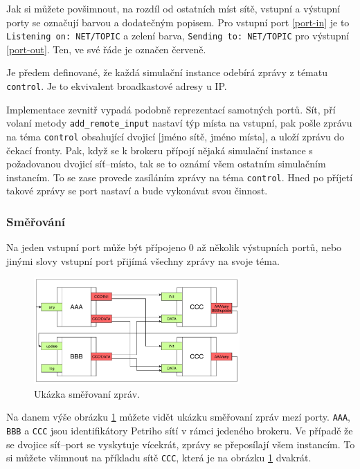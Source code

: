 Jak si můžete povšimnout, na rozdíl od ostatních míst sítě, vstupní a výstupní porty se označují barvou a dodatečným popisem. Pro vstupní port \ref{port-in} je to \texttt{Listening on: NET/TOPIC} a zelení barva, \texttt{Sending to: NET/TOPIC} pro výstupní \ref{port-out}. Ten, ve své řáde je označen červeně.

Je předem definované, že každá simulační instance odebírá zprávy z tématu \texttt{control}. Je to ekvivalent broadkastové adresy u IP.

Implementace zevnitř vypadá podobně reprezentací samotných portů. Sít, pří volaní metody \texttt{add\_remote\_input} nastaví týp místa na vstupní, pak pošle zprávu na téma \texttt{control} obsahující dvojicí [jméno sítě, jméno místa], a uloží zprávu do čekací fronty. Pak, když se k brokeru přípojí nějaká simulační instance s požadovanou dvojicí síť--místo, tak se to oznámí všem ostatním simulačním instancím. To se zase provede zasíláním zprávy na téma \texttt{control}. Hned po příjetí takové zprávy se port nastaví a bude vykonávat svou činnost.

\subsubsection{Směřování}
\label{subsec:mqtt-routing}

Na jeden vstupní port může být přípojeno 0 až několik výstupních portů, nebo jinými slovy vstupní port přijímá všechny zprávy na svoje téma.

\begin{figure}[htb]
  \centering
  \includegraphics[width=0.7\textwidth]{obrazky-figures/Port-routing.pdf}
  \caption{Ukázka směřovaní zpráv.}
  \label{route-viz}
\end{figure}

Na danem výše obrázku \ref{route-viz} můžete vidět ukázku směřovaní zpráv mezí porty. \texttt{AAA}, \texttt{BBB} a \texttt{CCC} jsou identifikátory Petriho sítí v rámci jedeného brokeru. Ve případě že se dvojice síť--port se vyskytuje vícekrát, zprávy se přeposílají všem instancím. To si můžete všimnout na příkladu sítě \texttt{CCC}, která je na obrázku \ref{route-viz} dvakrát.

